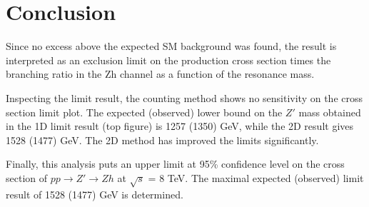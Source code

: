 \section{Conclusion}
Since no excess above the expected SM background was found, the result is interpreted as an exclusion limit on the production cross section times the branching ratio in the Zh channel as a function of the resonance mass.

Inspecting the limit result, the counting method shows no sensitivity on the cross section limit plot. The expected (observed) lower bound on the $Z'$ mass obtained in the 1D limit result (top figure) is 1257 (1350) GeV, while the 2D result gives 1528 (1477) GeV. The 2D method has improved the limits significantly.

Finally, this analysis puts an upper limit at 95\% confidence level on the cross section of $pp\rightarrow Z'\rightarrow Zh$ at $\sqrt{s}$ = 8 TeV. The maximal expected (observed) limit result of 1528 (1477) GeV is determined.

